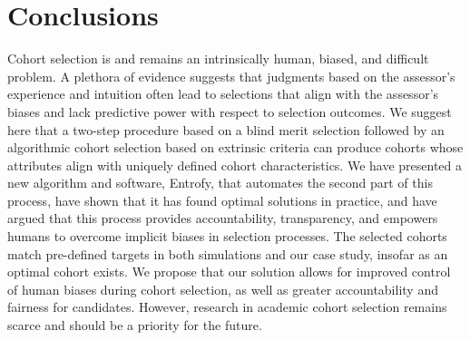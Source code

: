 \documentclass[12pt]{article}
\begin{document}
\section*{Conclusions}

Cohort selection is and remains an intrinsically human, biased, and difficult problem.
A plethora of evidence suggests that judgments based on the assessor's experience and intuition often lead to selections that align with the assessor's biases and lack predictive power with respect to selection outcomes.
We suggest here that a two-step procedure based on a blind merit selection followed by an algorithmic cohort selection based on extrinsic criteria can produce cohorts whose attributes align with uniquely defined cohort characteristics.
We have presented a new algorithm and software, Entrofy, that automates the second part of this process, have shown that it has found optimal solutions in practice, and have argued that this process provides accountability, transparency, and empowers humans to overcome implicit biases in selection processes.
The selected cohorts match pre-defined targets in both simulations and our case study, insofar as an optimal cohort exists.
We propose that our solution allows for improved control of human biases during cohort selection, as well as greater accountability and fairness for candidates.
However, research in academic cohort selection remains scarce and should be a priority for the future. 



%


\end{document}
